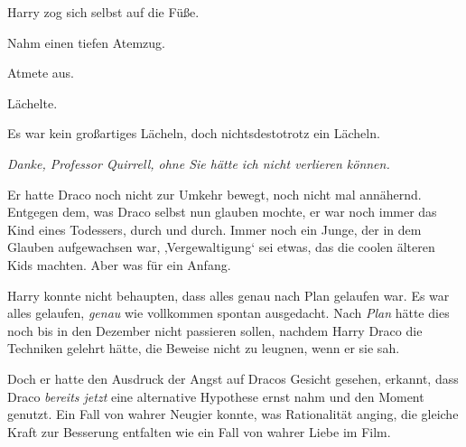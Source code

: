Harry zog sich selbst auf die Füße.

Nahm einen tiefen Atemzug.

Atmete aus.

Lächelte.

Es war kein großartiges Lächeln, doch nichtsdestotrotz ein Lächeln.

\emph{Danke, Professor Quirrell, ohne Sie hätte ich nicht verlieren können.}

Er hatte Draco noch nicht zur Umkehr bewegt, noch nicht mal annähernd. Entgegen dem, was Draco selbst nun glauben mochte, er war noch immer das Kind eines Todessers, durch und durch. Immer noch ein Junge, der in dem Glauben aufgewachsen war, ‚Vergewaltigung‘ sei etwas, das die coolen älteren Kids machten. Aber was für ein Anfang.

Harry konnte nicht behaupten, dass alles genau nach Plan gelaufen war. Es war alles gelaufen, \emph{genau} wie vollkommen spontan ausgedacht. Nach \emph{Plan} hätte dies noch bis in den Dezember nicht passieren sollen, nachdem Harry Draco die Techniken gelehrt hätte, die Beweise nicht zu leugnen, wenn er sie sah.

Doch er hatte den Ausdruck der Angst auf Dracos Gesicht gesehen, erkannt, dass Draco \emph{bereits jetzt} eine alternative Hypothese ernst nahm und den Moment genutzt. Ein Fall von wahrer Neugier konnte, was Rationalität anging, die gleiche Kraft zur Besserung entfalten wie ein Fall von wahrer Liebe im Film.

